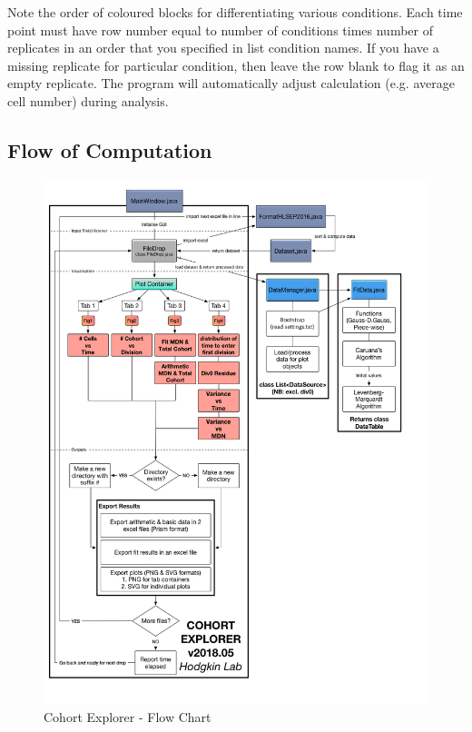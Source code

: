 \documentclass{article}
\begin{document}
Note the order of coloured blocks for differentiating various conditions. Each time point must have row number equal to number of conditions times number of replicates in an order that you specified in list condition names. If you have a missing replicate for particular condition, then leave the row blank to flag it as an empty replicate. The program will automatically adjust calculation (e.g. average cell number) during analysis.

\clearpage
\subsection{Flow of Computation}
\begin{figure}[h]
    \includegraphics[scale=0.34]{./img/cohortFlow2.png}
    \centering
    \caption{Cohort Explorer - Flow Chart}
    \label{fig3:cohortFlow}
\end{figure}
\end{document}
